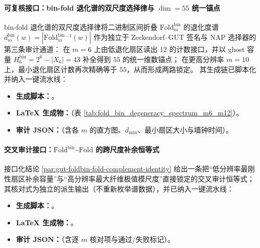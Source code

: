 \paragraph{可复核接口：bin-fold 退化谱的双尺度选择律与 \texorpdfstring{$\dim=55$}{dim=55} 统一锚点}
bin-fold 退化谱的双尺度选择律将二进制区间折叠 \(\mathrm{Fold}^{\mathrm{bin}}_m\) 的退化度谱
\(
d^{\mathrm{bin}}_m(w)=|\mathrm{Fold}^{\mathrm{bin}}_m{}^{-1}(w)|
\)
作为独立于 Zeckendorf--GUT 签名与 NAP 选择器的第三条审计通道：
在 \(m=6\) 上由低退化扇区读出 \(12\) 的计数接口，并以 ghost 容量 \(H^{\mathrm{bin}}_6=2^6-|X_6|=43\) 补全得到 \(55\) 的统一维数锚点；
在更高分辨率 \(m=10\) 上，最小退化扇区计数再次精确等于 \(55\)，从而形成两路锁定。
其生成链已脚本化并纳入一键流水线：
\begin{itemize}
  \item \textbf{生成脚本：}\texttt{}。
  \item \textbf{LaTeX 生成物：}\texttt{}（表 \ref{tab:fold_bin_degeneracy_spectrum_m6_m12}）。
  \item \textbf{审计 JSON：}\texttt{}（含各 \(m\) 的直方图、\(d_{\min}\)、最小扇区大小与墙钟时间）。
\end{itemize}

\paragraph{交叉审计接口：\texorpdfstring{$\mathrm{Fold}^{\mathrm{bin}}$}{Foldbin}–\texorpdfstring{$\mathrm{Fold}$}{Fold} 的跨尺度补余恒等式}
接口化结论 \ref{par:gut-foldbin-fold-complement-identity} 给出一条把“低分辨率最刚性扇区补余容量”与“高分辨率最大纤维极值模尺度”直接锁定的交叉审计恒等式；
其核对式为独立的派生输出（不重新枚举谱数据），并已纳入一键流水线：
\begin{itemize}
  \item \textbf{生成脚本：}\texttt{}。
  \item \textbf{LaTeX 生成物：}\texttt{}。
  \item \textbf{审计 JSON：}\texttt{}（含逐 \(m\) 核对项与通过/失败标记）。
\end{itemize}

